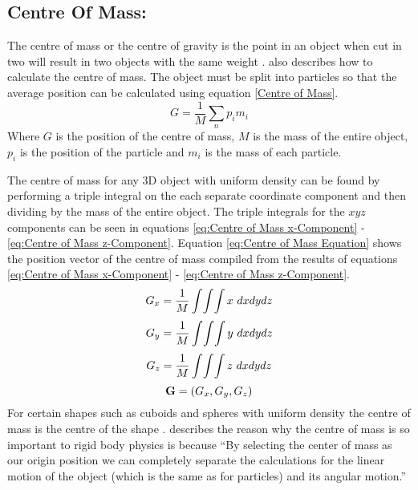 \subsection{Centre Of Mass:}\label{sc:COM}

The centre of mass or the centre of gravity is the point in an object when cut in two will result in two objects with the same weight \citep{millington2007game}. 
\citet{millington2007game} also describes how to calculate the centre of mass.
The object must be split into particles so that the average position can be calculated using equation \ref{Centre of Mass}. 
\begin{equation}\label{Centre of Mass}
   G=\frac{1}{M}\sum _{n}{p}_{i}{m}_{i} 
\end{equation}
Where $G$ is the position of the centre of mass, $M$ is the mass of the entire object, ${p}_{i}$ is the position of the particle and ${m}_{i}$ is the mass of each particle.

The centre of mass for any 3D object with uniform density can be found by performing a triple integral on the each separate coordinate component and then dividing by the mass of the entire object.
The triple integrals for the $xyz$ components can be seen in equations \ref{eq:Centre of Mass x-Component} - \ref{eq:Centre of Mass z-Component}.
Equation \ref{eq:Centre of Mass Equation} shows the position vector of the centre of mass compiled from the results of equations \ref{eq:Centre of Mass x-Component} - \ref{eq:Centre of Mass z-Component}.
\begin{equation} \label{eq:Centre of Mass x-Component}
	\centering
   G_{x}=\frac{1}{M}\int\!\int\!\int x\ dx dy dz
\end{equation}
\begin{equation} \label{eq:Centre of Mass y-Component}
	\centering
   G_{y}=\frac{1}{M}\int\!\int\!\int y\ dx dy dz
\end{equation}
\begin{equation} \label{eq:Centre of Mass z-Component}
	\centering
   G_{z}=\frac{1}{M}\int\!\int\!\int z\ dx dy dz
\end{equation}
\begin{equation} \label{eq:Centre of Mass Equation}
	\centering
   \mathbf{G}=(G_{x},G_{y},G_{z})
\end{equation}
For certain shapes such as cuboids and spheres with uniform density the centre of mass is the centre of the shape \citep{millington2007game}.
\citet{millington2007game} describes the reason why the centre of mass is so important to rigid body physics is because “By selecting the center of mass as our origin position we can completely separate the calculations for the linear motion of the object (which is the same as for particles) and its angular motion.” 